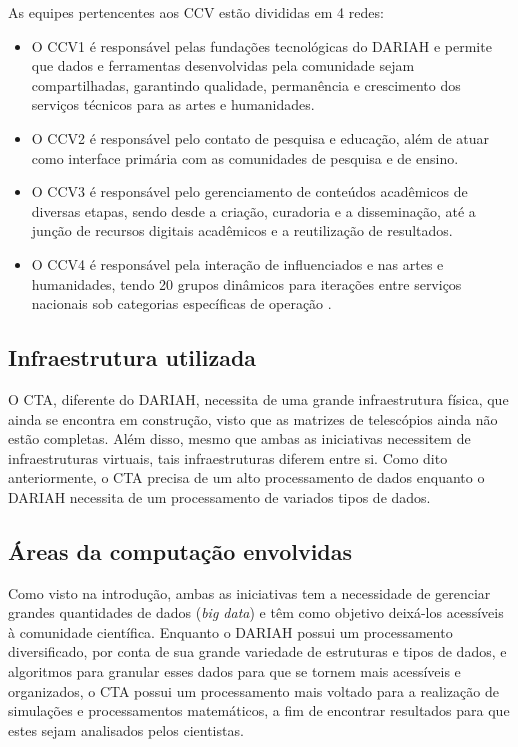 \documentclass[10pt, conference, compsocconf]{IEEEtran}
\begin{document}
As equipes pertencentes aos CCV estão divididas em 4 redes:
\begin{itemize}
\item O CCV1 é responsável pelas fundações tecnológicas do DARIAH e permite que dados e ferramentas desenvolvidas pela comunidade sejam compartilhadas, garantindo qualidade, permanência e crescimento dos serviços técnicos para as artes e humanidades.
\item O CCV2 é responsável pelo contato de pesquisa e educação, além de atuar como interface primária com as comunidades de pesquisa e de ensino.
\item O CCV3 é responsável pelo gerenciamento de conteúdos acadêmicos de diversas etapas, sendo desde a criação, curadoria e a disseminação, até a junção de recursos digitais acadêmicos e a reutilização de resultados.
\item O CCV4 é responsável pela interação de influenciados e nas artes e humanidades, tendo 20 grupos dinâmicos para iterações entre serviços nacionais sob categorias específicas de operação \cite{EGI_dariah_eric}. 
\end{itemize}


\subsection{Infraestrutura utilizada}
O CTA, diferente do DARIAH, necessita de uma grande infraestrutura física, que ainda se encontra em construção, visto que as matrizes de telescópios ainda não estão completas. Além disso, mesmo que ambas as iniciativas necessitem de infraestruturas virtuais, tais infraestruturas diferem entre si. Como dito anteriormente, o CTA precisa de um alto processamento de dados enquanto o DARIAH necessita de um processamento de variados tipos de dados.


\subsection{Áreas da computação envolvidas}
Como visto na introdução, ambas as iniciativas tem a necessidade de gerenciar grandes quantidades de dados (\textit{big data}) e têm como objetivo deixá-los acessíveis à comunidade científica. Enquanto o DARIAH possui um processamento diversificado, por conta de sua grande variedade de estruturas e tipos de dados, e algoritmos para granular esses dados para que se tornem mais acessíveis e organizados, o CTA possui um processamento mais voltado para a realização de simulações e processamentos matemáticos, a fim de encontrar resultados para que estes sejam analisados pelos cientistas.
\end{document}
